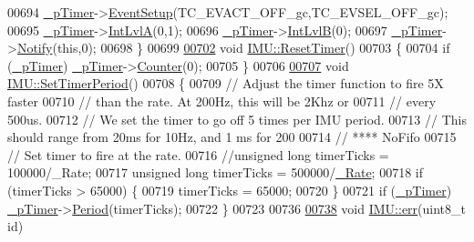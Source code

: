\begin{DoxyCode}
{{{{00694     \hyperlink{class_i_m_u_a16e73b1457a346aed16d4b61fae7f2c4}{_pTimer}->\hyperlink{class_timer_cntr_a27f54d05be459f37793e98743325a614}{EventSetup}(TC\_EVACT\_OFF\_gc,TC\_EVSEL\_OFF\_gc);
00695     \hyperlink{class_i_m_u_a16e73b1457a346aed16d4b61fae7f2c4}{_pTimer}->\hyperlink{class_timer_cntr_a3d9d3bca0c89f5dbc69b34406ef6c4be}{IntLvlA}(0,1);
00696     \hyperlink{class_i_m_u_a16e73b1457a346aed16d4b61fae7f2c4}{_pTimer}->\hyperlink{class_timer_cntr_a687162461b8b992093f3573356506a8c}{IntLvlB}(0);
00697     \hyperlink{class_i_m_u_a16e73b1457a346aed16d4b61fae7f2c4}{_pTimer}->\hyperlink{class_timer_cntr_a71bf73ee43e8d344d1241695b553556b}{Notify}(\textcolor{keyword}{this},0);
00698 \}
00699 
\hypertarget{_i_m_u_8cpp_source_l00702}{}\hyperlink{class_i_m_u_a187dc9de30f97f5154e0ff904eb6ee1a}{00702} \textcolor{keywordtype}{void} \hyperlink{class_i_m_u_a187dc9de30f97f5154e0ff904eb6ee1a}{IMU::ResetTimer}()
00703 \{
00704     \textcolor{keywordflow}{if} (\hyperlink{class_i_m_u_a16e73b1457a346aed16d4b61fae7f2c4}{_pTimer}) \hyperlink{class_i_m_u_a16e73b1457a346aed16d4b61fae7f2c4}{_pTimer}->\hyperlink{class_timer_cntr_a483fd3e00603951991333699a1be67ea}{Counter}(0);
00705 \}
00706 
\hypertarget{_i_m_u_8cpp_source_l00707}{}\hyperlink{class_i_m_u_a3ce9934e64dff87e18b6cc3f3700f72f}{00707} \textcolor{keywordtype}{void} \hyperlink{class_i_m_u_a3ce9934e64dff87e18b6cc3f3700f72f}{IMU::SetTimerPeriod}()
00708 \{
00709     \textcolor{comment}{// Adjust the timer function to fire 5X faster}
00710     \textcolor{comment}{// than the rate. At 200Hz, this will be 2Khz or }
00711     \textcolor{comment}{// every 500us. }
00712     \textcolor{comment}{// We set the timer to go off 5 times per IMU period.}
00713     \textcolor{comment}{// This should range from 20ms for 10Hz, and 1 ms for 200}
00714     \textcolor{comment}{// **** NoFifo}
00715     \textcolor{comment}{// Set timer to fire at the rate.}
00716     \textcolor{comment}{//unsigned long timerTicks = 100000/\_Rate;}
00717     \textcolor{keywordtype}{unsigned} \textcolor{keywordtype}{long} timerTicks = 500000/\hyperlink{class_i_m_u_aafe9be107385c7ccedeb1539cf6d7fce}{_Rate};
00718     \textcolor{keywordflow}{if} (timerTicks > 65000) \{
00719         timerTicks = 65000;
00720     \}
00721     \textcolor{keywordflow}{if} (\hyperlink{class_i_m_u_a16e73b1457a346aed16d4b61fae7f2c4}{_pTimer}) \hyperlink{class_i_m_u_a16e73b1457a346aed16d4b61fae7f2c4}{_pTimer}->\hyperlink{class_timer_cntr_a3f1c57b8f31a717b5de335cd56408029}{Period}(timerTicks);
00722 \}
00723 
00736 
\hypertarget{_i_m_u_8cpp_source_l00738}{}\hyperlink{class_i_m_u_ae56d268445b752f9720c814cb294ba40}{00738} \textcolor{keywordtype}{void} \hyperlink{class_i_m_u_ae56d268445b752f9720c814cb294ba40}{IMU::err}(uint8\_t \textcolor{keywordtype}{id})
}}}}
\end{DoxyCode}
